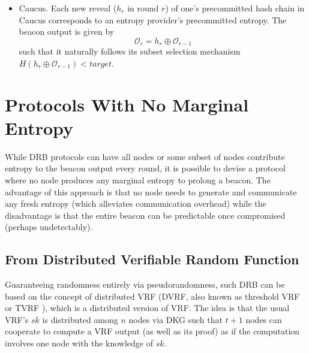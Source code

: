 \documentclass[letterpaper,twocolumn,10pt]{article}
\theoremstyle{definition}
\theoremstyle{remark}
\begin{document}
\begin{itemize}
\item Caucus. Each new reveal ($h_r$ in round $r$) of one's precommitted hash chain in Caucus corresponds to an entropy provider's precommitted entropy. The beacon output is given by
\[
\mathcal{O}_r = h_r \oplus \mathcal{O}_{r - 1}
\]
such that it naturally follows its subset selection mechanism $H(h_r \oplus \mathcal{O}_{r - 1}) < target$.
\end{itemize}

\section{Protocols With No Marginal Entropy}
\label{section:dvrf}
While DRB protocols can have all nodes or some subset of nodes contribute entropy to the beacon output every round, it is possible to devise a protocol where no node produces any marginal entropy to prolong a beacon. The advantage of this approach is that no node needs to generate and communicate any fresh entropy (which alleviates communication overhead) while the disadvantage is that the entire beacon can be predictable once compromised (perhaps undetectably).

\subsection{From Distributed Verifiable Random Function}
Guaranteeing randomness entirely via pseudorandomness, such DRB can be based on the concept of distributed VRF \cite{hanke2018dfinity,galindo2020fully} (DVRF, also known as threshold VRF or TVRF \cite{cascudomt}), which is a distributed version of VRF. The idea is that the usual VRF's $sk$ is distributed among $n$ nodes via DKG such that $t + 1$ nodes can cooperate to compute a VRF output (as well as its proof) as if the computation involves one node with the knowledge of $sk$.
\end{document}
